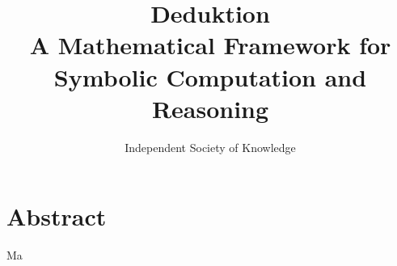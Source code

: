 \documentclass[10pt]{article}
\title{Deduktion \\ \large A Mathematical Framework for Symbolic Computation and Reasoning}
\author{Independent Society of Knowledge}
\begin{document}
\maketitle

\section*{Abstract}
    Ma
\end{document}
